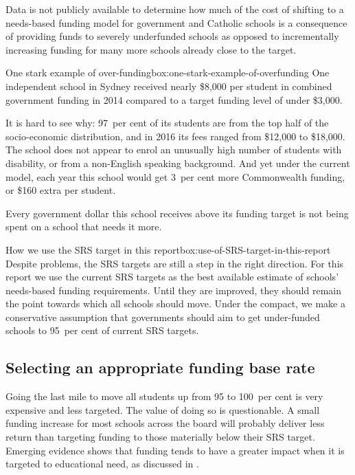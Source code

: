 \documentclass{grattan}
\begin{document}
Data is not publicly available to determine how much of the cost of shifting to a needs-based funding model for government and Catholic schools is a consequence of providing funds to severely underfunded schools as opposed to incrementally increasing funding for many more schools already close to the target.

\begin{smallbox}[!p]{One stark example of over-funding}{box:one-stark-example-of-overfunding}
One independent school in Sydney received nearly \$8,000 per student in combined government funding in 2014 compared to a target funding level of under \$3,000.

It is hard to see why: 97~per cent of its students are from the top half of the socio-economic distribution, and in 2016 its fees ranged from \$12,000 to \$18,000.
The school does not appear to enrol an unusually high number of students with disability, or from a non-English speaking background.
And yet under the current model, each year this school would get 3~per cent more Commonwealth funding, or \$160 extra per student.

Every government dollar this school receives above its funding target is not being spent on a school that needs it more.
\end{smallbox}

\begin{verysmallbox}[!p]{How we use the SRS target in this report}{box:use-of-SRS-target-in-this-report}
Despite problems, the SRS targets are still a step in the right direction. For this report we use the current SRS targets as the best available estimate of schools' needs-based funding requirements. Until they are improved, they should remain the point towards which all schools should move.
Under the compact, we make a conservative assumption that governments should aim to get under-funded schools to 95~per cent of current SRS targets.
\end{verysmallbox}




\subsection{Selecting an appropriate funding base rate} \label{subsec:Selecting-an-appropriate-funding-base-rate}

Going the last mile to move all students up from 95 to 100~per cent is very expensive and less targeted.
The value of doing so is questionable.
A small funding increase for most schools across the board will probably deliver less return than targeting funding to those materially below their SRS target.
Emerging evidence shows that funding tends to have a greater impact when it is targeted to educational need, as discussed in .
\end{document}
